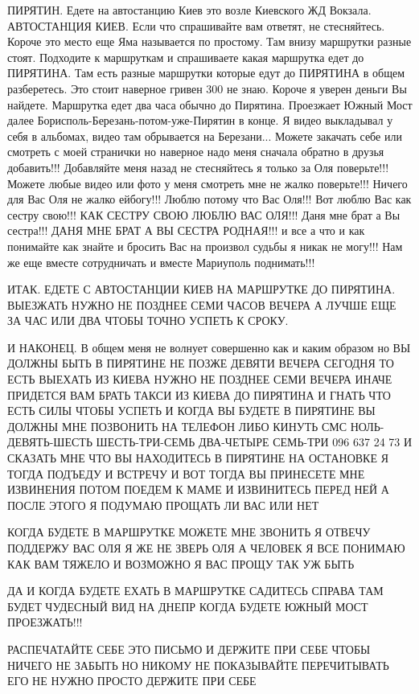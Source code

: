 ПИРЯТИН. Едете на автостанцию Киев это возле Киевского ЖД Вокзала. АВТОСТАНЦИЯ
КИЕВ. Если что спрашивайте вам ответят, не стесняйтесь.  Короче это место еще
Яма называется по простому. Там внизу маршрутки разные стоят.  Подходите к
маршруткам и спрашиваете какая маршрутка едет до ПИРЯТИНА. Там есть разные
маршрутки которые едут до ПИРЯТИНА в общем разберетесь. Это стоит наверное
гривен 300 не знаю. Короче я уверен деньги Вы найдете.  Маршрутка едет два часа
обычно до Пирятина. Проезжает Южный Мост далее
Борисполь-Березань-потом-уже-Пирятин в конце.  Я видео выкладывал у себя в
альбомах, видео там обрывается на Березани... Можете закачать себе или смотреть
с моей странички но наверное надо меня сначала обратно в друзья добавить!!!
Добавляйте меня назад не стесняйтесь я только за Оля поверьте!!!  Можете любые
видео или фото у меня смотреть мне не жалко поверьте!!! Ничего для Вас Оля не
жалко ейбогу!!!  Люблю потому что Вас Оля!!! Вот люблю Вас как сестру свою!!!
КАК СЕСТРУ СВОЮ ЛЮБЛЮ ВАС ОЛЯ!!!
Даня мне брат а Вы сестра!!! ДАНЯ МНЕ БРАТ А ВЫ СЕСТРА РОДНАЯ!!! и все а что и как понимайте как знайте и бросить
Вас на произвол судьбы я никак не могу!!!  Нам же еще вместе сотрудничать и
вместе Мариуполь поднимать!!!

ИТАК. ЕДЕТЕ С АВТОСТАНЦИИ КИЕВ НА МАРШРУТКЕ ДО ПИРЯТИНА. ВЫЕЗЖАТЬ НУЖНО НЕ ПОЗДНЕЕ СЕМИ ЧАСОВ ВЕЧЕРА
А ЛУЧШЕ ЕЩЕ ЗА ЧАС ИЛИ ДВА ЧТОБЫ ТОЧНО УСПЕТЬ К СРОКУ.

И НАКОНЕЦ. В общем меня не волнует совершенно как и каким образом но ВЫ ДОЛЖНЫ БЫТЬ В
ПИРЯТИНЕ НЕ ПОЗЖЕ ДЕВЯТИ ВЕЧЕРА СЕГОДНЯ ТО ЕСТЬ ВЫЕХАТЬ ИЗ КИЕВА НУЖНО НЕ
ПОЗДНЕЕ СЕМИ ВЕЧЕРА ИНАЧЕ ПРИДЕТСЯ ВАМ БРАТЬ ТАКСИ ИЗ КИЕВА ДО ПИРЯТИНА И ГНАТЬ
ЧТО ЕСТЬ СИЛЫ ЧТОБЫ УСПЕТЬ И КОГДА ВЫ БУДЕТЕ В ПИРЯТИНЕ ВЫ ДОЛЖНЫ МНЕ ПОЗВОНИТЬ
НА ТЕЛЕФОН ЛИБО КИНУТЬ СМС НОЛЬ-ДЕВЯТЬ-ШЕСТЬ ШЕСТЬ-ТРИ-СЕМЬ ДВА-ЧЕТЫРЕ СЕМЬ-ТРИ
096 637 24 73 И СКАЗАТЬ МНЕ ЧТО ВЫ НАХОДИТЕСЬ В ПИРЯТИНЕ НА ОСТАНОВКЕ Я ТОГДА
ПОДЪЕДУ И ВСТРЕЧУ И ВОТ ТОГДА ВЫ ПРИНЕСЕТЕ МНЕ ИЗВИНЕНИЯ ПОТОМ ПОЕДЕМ К МАМЕ И
ИЗВИНИТЕСЬ ПЕРЕД НЕЙ А ПОСЛЕ ЭТОГО Я ПОДУМАЮ ПРОЩАТЬ ЛИ ВАС ИЛИ НЕТ

КОГДА БУДЕТЕ В МАРШРУТКЕ МОЖЕТЕ МНЕ ЗВОНИТЬ Я ОТВЕЧУ ПОДДЕРЖУ ВАС ОЛЯ 
Я ЖЕ НЕ ЗВЕРЬ ОЛЯ А ЧЕЛОВЕК Я ВСЕ ПОНИМАЮ КАК ВАМ ТЯЖЕЛО И ВОЗМОЖНО Я ВАС ПРОЩУ 
ТАК УЖ БЫТЬ

ДА И КОГДА БУДЕТЕ ЕХАТЬ В МАРШРУТКЕ САДИТЕСЬ СПРАВА ТАМ БУДЕТ ЧУДЕСНЫЙ ВИД НА ДНЕПР КОГДА 
БУДЕТЕ ЮЖНЫЙ МОСТ ПРОЕЗЖАТЬ!!!

РАСПЕЧАТАЙТЕ СЕБЕ ЭТО ПИСЬМО И ДЕРЖИТЕ ПРИ СЕБЕ ЧТОБЫ НИЧЕГО НЕ ЗАБЫТЬ
НО НИКОМУ НЕ ПОКАЗЫВАЙТЕ ПЕРЕЧИТЫВАТЬ ЕГО НЕ НУЖНО ПРОСТО ДЕРЖИТЕ ПРИ СЕБЕ

